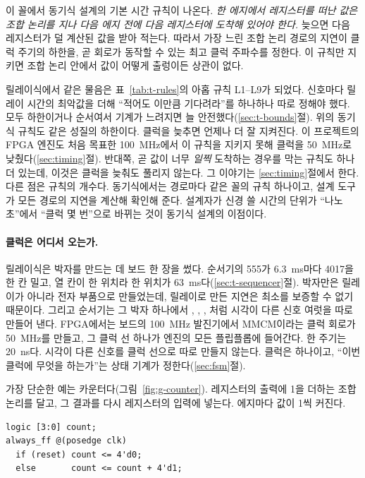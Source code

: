 \Why 이 꼴에서 동기식 설계의 기본 시간 규칙이 나온다. \emph{한 에지에서 레지스터를 떠난 값은 조합
논리를 지나 다음 에지 전에 다음 레지스터에 도착해 있어야 한다.} 늦으면 다음 레지스터가 덜 계산된 값을
받아 적는다. 따라서 가장 느린 조합 논리 경로의 지연이 클럭 주기의 하한을, 곧 회로가 동작할 수 있는
최고 클럭 주파수를 정한다. 이 규칙만 지키면 조합 논리 안에서 값이 어떻게 출렁이든 상관이 없다.

릴레이식에서 같은 물음은 표~\ref{tab:t-rules}의 아홉 규칙 L1--L9가 되었다. 신호마다 릴레이 시간의 최악값을
더해 ``적어도 이만큼 기다려라''를 하나하나 따로 정해야 했다. 모두 하한이거나 순서여서 기계가 느려지면 늘
안전했다(\ref{sec:t-bounds}절). 위의 동기식 규칙도 같은 성질의 하한이다. 클럭을 늦추면 언제나 더 잘 지켜진다.
이 프로젝트의 FPGA 엔진도 처음 목표한 100~MHz에서 이 규칙을 지키지 못해 클럭을 50~MHz로
낮췄다(\ref{sec:timing}절). 반대쪽, 곧 값이 너무 \emph{일찍} 도착하는 경우를 막는 규칙도 하나 더 있는데, 이것은
클럭을 늦춰도 풀리지 않는다. 그 이야기는 \ref{sec:timing}절에서 한다. 다른 점은 규칙의 개수다. 동기식에서는 경로마다 같은 꼴의 규칙 하나이고, 설계
도구가 모든 경로의 지연을 계산해 확인해 준다. 설계자가 신경 쓸 시간의 단위가 ``나노초''에서 ``클럭 몇
번''으로 바뀌는 것이 동기식 설계의 이점이다.

\paragraph{클럭은 어디서 오는가.} 릴레이식은 박자를 만드는 데 보드 한 장을 썼다. 순서기의 555가 6.3~ms마다
4017을 한 칸 밀고, 열 칸이 한 위치라 한 위치가 63~ms다(\ref{sec:t-sequencer}절). 박자만은 릴레이가 아니라 전자
부품으로 만들었는데, 릴레이로 만든 지연은 최소를 보증할 수 없기 때문이다. 그리고 순서기는 그 박자 하나에서
, , , 처럼 시각이 다른 신호 여럿을 따로 만들어 낸다. FPGA에서는
보드의 100~MHz 발진기에서 MMCM이라는 클럭 회로가 50~MHz를 만들고, 그 클럭 선 하나가 엔진의 모든 플립플롭에
들어간다. 한 주기는 20~ns다. 시각이 다른 신호를 클럭 선으로 따로 만들지 않는다. 클럭은 하나이고, ``이번
클럭에 무엇을 하는가''는 상태 기계가 정한다(\ref{sec:fsm}절).

\General 가장 단순한 예는 카운터다(그림~\ref{fig:g-counter}). 레지스터의 출력에 1을 더하는 조합 논리를
달고, 그 결과를 다시 레지스터의 입력에 넣는다. 에지마다 값이 1씩 커진다.

\begin{lstlisting}[language=SV,numbers=none]
logic [3:0] count;
always_ff @(posedge clk)
  if (reset) count <= 4'd0;
  else       count <= count + 4'd1;
\end{lstlisting}

